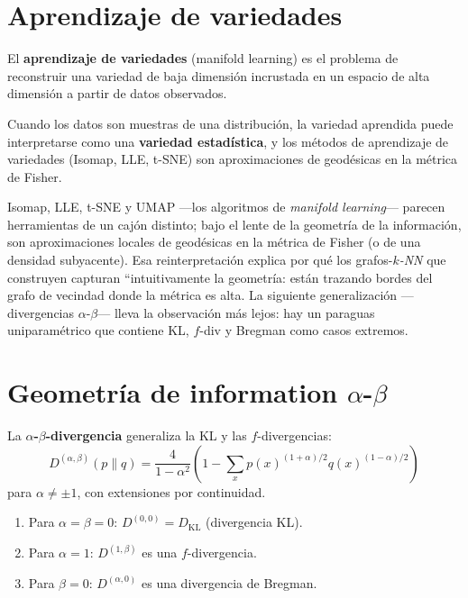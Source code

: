 \section{Aprendizaje de variedades}

\begin{definition}
	El \textbf{aprendizaje de variedades} (manifold learning) es el problema de reconstruir una variedad de baja dimensión incrustada en un espacio de alta dimensión a partir de datos observados.
\end{definition}

\begin{proposition}
	Cuando los datos son muestras de una distribución, la variedad aprendida puede interpretarse como una \textbf{variedad estadística}, y los métodos de aprendizaje de variedades (Isomap, LLE, t-SNE) son aproximaciones de geodésicas en la métrica de Fisher.
\end{proposition}

\bigskip
\noindent
Isomap, LLE, t-SNE y UMAP ---los algoritmos de \emph{manifold learning}--- parecen herramientas de un cajón distinto; bajo el lente de la geometría de la información, son aproximaciones locales de geodésicas en la métrica de Fisher (o de una densidad subyacente). Esa reinterpretación explica por qué los grafos-\emph{$k$-NN} que construyen capturan ``intuitivamente la geometría: están trazando bordes del grafo de vecindad donde la métrica es alta. La siguiente generalización ---divergencias $\alpha$-$\beta$--- lleva la observación más lejos: hay un paraguas uniparamétrico que contiene KL, $f$-div y Bregman como casos extremos.

\section[Geometria de information alpha-beta]{Geometría de information $\alpha$-$\beta$}

\begin{definition}
	La \textbf{$\alpha$-$\beta$-divergencia} generaliza la KL y las $f$-divergencias:
	\[
	D^{(\alpha,\beta)}(p \| q) = \frac{4}{1-\alpha^2}\left(1 - \sum_x p(x)^{(1+\alpha)/2} q(x)^{(1-\alpha)/2}\right)
	\]
	para $\alpha \ne \pm 1$, con extensiones por continuidad.
\end{definition}

\begin{theorem}[Propiedades]
	\begin{enumerate}
		\item Para $\alpha = \beta = 0$: $D^{(0,0)} = D_{\mathrm{KL}}$ (divergencia KL).
		\item Para $\alpha = 1$: $D^{(1,\beta)}$ es una $f$-divergencia.
		\item Para $\beta = 0$: $D^{(\alpha,0)}$ es una divergencia de Bregman.
	\end{enumerate}
\end{theorem}

